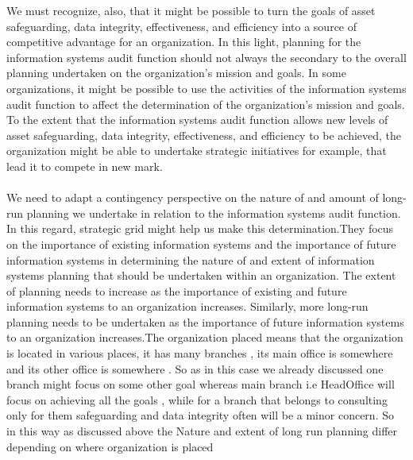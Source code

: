 \documentclass[12pt]{article}
\begin{document}
We must recognize, also, that it might be possible to turn the goals of asset safeguarding, data integrity, effectiveness, and efficiency into a source of competitive advantage for an organization. In this light, planning for the information systems audit function should not always the secondary to the overall planning undertaken on the organization's mission and goals. In some organizations, it might be possible to use the activities of the information systems audit function to affect the determination of the organization's mission and goals. To the extent that the information systems audit function allows new levels of asset safeguarding, data integrity, effectiveness, and efficiency to be achieved, the organization might be able to undertake strategic initiatives for example, that lead it to compete in new mark.\\\\
We need to adapt a contingency perspective on the nature of and amount of long-run planning we undertake in relation to the information systems audit function. In this regard, strategic grid might help us make this determination.They focus on the importance of existing information systems and the importance of future information systems in determining the nature of and extent of information systems planning that should be undertaken within an organization. The extent of planning needs to increase as the importance of existing and future information systems to an organization increases. Similarly, more long-run planning needs to be undertaken as the importance of future information systems to an organization increases.The organization placed means that the organization is located in various places, it has many branches , its main office is somewhere and its other office is somewhere . So as in this case we already discussed one branch might focus on some other goal whereas main branch i.e HeadOffice will focus on achieving all the goals , while for a branch that belongs to consulting only for them safeguarding and data integrity often will be a minor concern. So in this way as discussed above the Nature and extent of long run planning differ depending on where organization is placed\\\\
\end{document}
